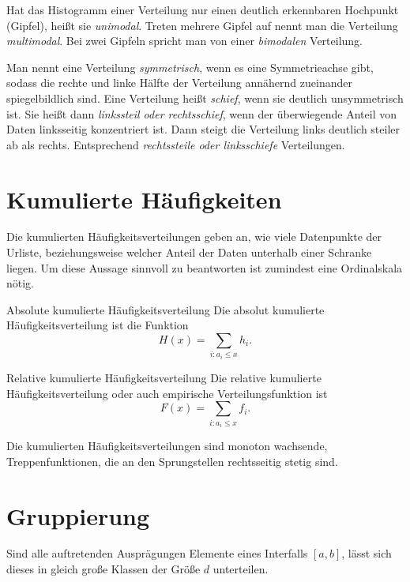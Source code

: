 Hat das Histogramm einer Verteilung nur einen deutlich erkennbaren Hochpunkt (Gipfel), heißt sie \emph{unimodal}. Treten mehrere Gipfel auf nennt man die Verteilung \emph{multimodal}. Bei zwei Gipfeln spricht man von einer \emph{bimodalen} Verteilung.

Man nennt eine Verteilung \emph{symmetrisch}, wenn es eine Symmetrieachse gibt, sodass die rechte und linke Hälfte der Verteilung annähernd zueinander spiegelbildlich sind. 
Eine Verteilung heißt \emph{schief}, wenn sie deutlich unsymmetrisch ist. Sie heißt dann \emph{linkssteil oder rechtsschief}, wenn der überwiegende Anteil von Daten linksseitig konzentriert ist. Dann steigt die Verteilung links deutlich steiler ab als rechts. Entsprechend \emph{rechtssteile oder linksschiefe} Verteilungen.


\section{Kumulierte Häufigkeiten}
Die kumulierten Häufigkeitsverteilungen geben an, wie viele Datenpunkte der Urliste, beziehungsweise welcher Anteil der Daten unterhalb einer Schranke liegen. Um diese Aussage sinnvoll zu beantworten ist zumindest eine Ordinalskala nötig.

\begin{definition}{Absolute kumulierte Häufigkeitsverteilung}
	Die absolut kumulierte Häufigkeitsverteilung ist die Funktion
	\begin{equation*}
		H(x)=\sum\limits_{i:a_i\leq x} h_i.
	\end{equation*}
\end{definition}
\begin{definition}{Relative kumulierte Häufigkeitsverteilung}
	Die relative kumulierte Häufigkeitsverteilung oder auch empirische Verteilungsfunktion ist
	\begin{equation*}
		F(x)=\sum\limits_{i:a_i\leq x} f_i.
	\end{equation*}
\end{definition}
Die kumulierten Häufigkeitsverteilungen sind monoton wachsende, Treppenfunktionen, die an den Sprungstellen rechtsseitig stetig sind.



\section{Gruppierung}
Sind alle auftretenden Ausprägungen Elemente eines Interfalls $[a,b]$, lässt sich dieses in gleich große Klassen der Größe $d$ unterteilen.

